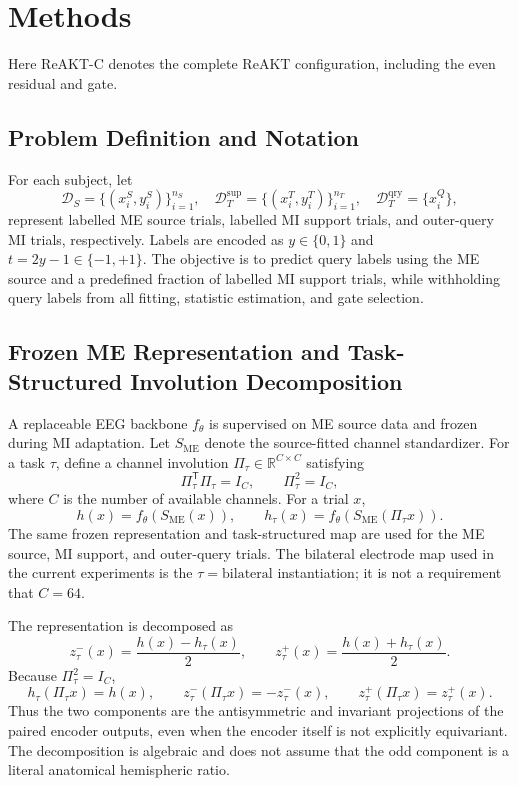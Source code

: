 \documentclass[preprint,12pt]{elsarticle}
\begin{document}
\section{Methods}
Here ReAKT-C denotes the complete ReAKT configuration, including the even residual and gate.

\subsection{Problem Definition and Notation}
For each subject, let
\begin{equation}
\mathcal{D}_{S}=\{(x_i^S,y_i^S)\}_{i=1}^{n_S},\quad
\mathcal{D}_{T}^{\mathrm{sup}}=\{(x_i^T,y_i^T)\}_{i=1}^{n_T},\quad
\mathcal{D}_{T}^{\mathrm{qry}}=\{x_i^Q\},
\end{equation}
represent labelled ME source trials, labelled MI support trials, and outer-query MI trials, respectively. Labels are encoded as $y\in\{0,1\}$ and $t=2y-1\in\{-1,+1\}$. The objective is to predict query labels using the ME source and a predefined fraction of labelled MI support trials, while withholding query labels from all fitting, statistic estimation, and gate selection.

\subsection{Frozen ME Representation and Task-Structured Involution Decomposition}
A replaceable EEG backbone $f_{\theta}$ is supervised on ME source data and frozen during MI adaptation. Let $S_{\mathrm{ME}}$ denote the source-fitted channel standardizer. For a task $\tau$, define a channel involution $\Pi_{\tau}\in\mathbb{R}^{C\times C}$ satisfying
\begin{equation}
\Pi_{\tau}^{\mathsf T}\Pi_{\tau}=I_C,\qquad \Pi_{\tau}^{2}=I_C,
\end{equation}
where $C$ is the number of available channels. For a trial $x$,
\begin{equation}
h(x)=f_{\theta}(S_{\mathrm{ME}}(x)),\qquad
h_{\tau}(x)=f_{\theta}(S_{\mathrm{ME}}(\Pi_{\tau}x)).
\end{equation}
The same frozen representation and task-structured map are used for the ME source, MI support, and outer-query trials. The bilateral electrode map used in the current experiments is the $\tau=\mathrm{bilateral}$ instantiation; it is not a requirement that $C=64$.

The representation is decomposed as
\begin{equation}
z^{-}_{\tau}(x)=\frac{h(x)-h_{\tau}(x)}{2},\qquad
z^{+}_{\tau}(x)=\frac{h(x)+h_{\tau}(x)}{2}.
\end{equation}
Because $\Pi_{\tau}^{2}=I_C$,
\begin{equation}
h_{\tau}(\Pi_{\tau}x)=h(x),\qquad
z^{-}_{\tau}(\Pi_{\tau}x)=-z^{-}_{\tau}(x),\qquad
z^{+}_{\tau}(\Pi_{\tau}x)=z^{+}_{\tau}(x).
\end{equation}
Thus the two components are the antisymmetric and invariant projections of the paired encoder outputs, even when the encoder itself is not explicitly equivariant. The decomposition is algebraic and does not assume that the odd component is a literal anatomical hemispheric ratio.
\end{document}
